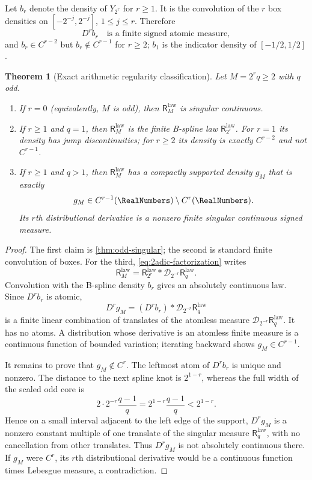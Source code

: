 \documentclass[11pt,oneside]{article}
\newtheorem{theorem}{Theorem}[section]
\theoremstyle{definition}
\theoremstyle{remark}
\newcommand{\D}{\mathcal D}
\newcommand{\ReciprocalIntegerLaw}[1]{\mathsf R^{\mathrm{law}}_{#1}}
\begin{document}
Let $b_r$ denote the density of $Y_{2^r}$ for $r\ge1$.  It is the convolution of the
$r$ box densities on $[-2^{-j},2^{-j}]$, $1\le j\le r$.  Therefore
\begin{equation}
 D^r b_r
 \quad\text{is a finite signed atomic measure},
 \label{eq:spline-r-derivative}
\end{equation}
and $b_r\in C^{r-2}$ but $b_r\notin C^{r-1}$ for $r\ge2$; $b_1$ is the indicator density
of $[-1/2,1/2]$.

\begin{theorem}[Exact arithmetic regularity classification]
\label{thm:regularity}
Let $M=2^rq\ge2$ with $q$ odd.
\begin{enumerate}
\item If $r=0$ (equivalently, $M$ is odd), then $\ReciprocalIntegerLaw{M}$ is singular continuous.
\item If $r\ge1$ and $q=1$, then $\ReciprocalIntegerLaw{M}$ is the finite B-spline law $\ReciprocalIntegerLaw{2^r}$.
For $r=1$ its density has jump discontinuities; for $r\ge2$ its density is exactly
$C^{r-2}$ and not $C^{r-1}$.
\item If $r\ge1$ and $q>1$, then $\ReciprocalIntegerLaw{M}$ has a compactly supported density $g_M$ that is
exactly
\begin{equation}
 g_M\in C^{r-1}(\RealNumbers)\setminus C^r(\RealNumbers).
 \label{eq:exact-regularity}
\end{equation}
Its $r$th distributional derivative is a nonzero finite singular continuous signed measure.
\end{enumerate}
\end{theorem}

\begin{proof}
The first claim is \cref{thm:odd-singular}; the second is standard finite convolution of
boxes.  For the third, \eqref{eq:2adic-factorization} writes
\[
 \ReciprocalIntegerLaw{M}=\ReciprocalIntegerLaw{2^r}*\D_{2^{-r}}\ReciprocalIntegerLaw{q}.
\]
Convolution with the B-spline density $b_r$ gives an absolutely continuous law.  Since
$D^r b_r$ is atomic,
\[
 D^r g_M=(D^r b_r)*\D_{2^{-r}}\ReciprocalIntegerLaw{q}
\]
is a finite linear combination of translates of the atomless measure
$\D_{2^{-r}}\ReciprocalIntegerLaw{q}$.  It has no atoms.  A distribution whose derivative is an atomless
finite measure is a continuous function of bounded variation; iterating backward shows
$g_M\in C^{r-1}$.

It remains to prove that $g_M\notin C^r$.  The leftmost atom of $D^r b_r$ is unique and
nonzero.  The distance to the next spline knot is $2^{1-r}$, whereas the full width of the
scaled odd core is
\[
 2\cdot 2^{-r}\frac{q-1}{q}=2^{1-r}\frac{q-1}{q}<2^{1-r}.
\]
Hence on a small interval adjacent to the left edge of the support, $D^r g_M$ is a
nonzero constant multiple of one translate of the singular measure $\ReciprocalIntegerLaw{q}$, with no
cancellation from other translates.  Thus $D^r g_M$ is not absolutely continuous there.
If $g_M$ were $C^r$, its $r$th distributional derivative would be a continuous function
times Lebesgue measure, a contradiction.
\end{proof}
\end{document}
